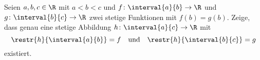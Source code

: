 \begin{exercise}
  Seien $a, b, c \in \R$ mit $a < b < c$ und $f \colon \interval{a}{b} \to \R$
  und $g \colon \interval{b}{c} \to \R$ zwei stetige Funktionen mit $f(b) =
  g(b)$. Zeige, dass genau eine stetige Abbildung $h \colon \interval{a}{c} \to
  \R$ mit
  \begin{equation*}
    \restr{h}{\interval{a}{b}} = f
    \quad \text{und} \quad
    \restr{h}{\interval{b}{c}} = g
  \end{equation*}
  existiert.
\end{exercise}
